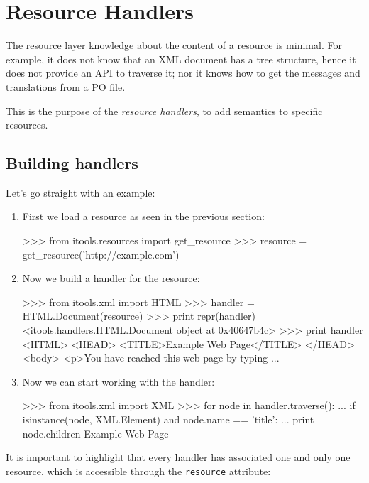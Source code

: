 \chapter{Resource Handlers}

The resource layer knowledge about the content of a resource is minimal.
For example, it does not know that an XML document has a tree structure,
hence it does not provide an API to traverse it; nor it knows how to get
the messages and translations from a PO file.

This is the purpose of the {\em resource handlers}, to add semantics to
specific resources.


\section{Building handlers}

Let's go straight with an example:

\begin{enumerate}
  \item First we load a resource as seen in the previous section:
\begin{code}
    >>> from itools.resources import get_resource
    >>> resource = get_resource('http://example.com')
\end{code}

  \item Now we build a handler for the resource:
\begin{code}
    >>> from itools.xml import HTML
    >>> handler = HTML.Document(resource)
    >>> print repr(handler)
    <itools.handlers.HTML.Document object at 0x40647b4c>
    >>> print handler
    <HTML>
    <HEAD>
      <TITLE>Example Web Page</TITLE>
    </HEAD> 
    <body>  
    <p>You have reached this web page by typing
    ...
\end{code}

  \item Now we can start working with the handler:
\begin{code}
    >>> from itools.xml import XML
    >>> for node in handler.traverse():
    ...     if isinstance(node, XML.Element) and node.name == 'title':
    ...         print node.children
    Example Web Page
\end{code}
\end{enumerate}



It is important to highlight that every handler has associated one and only
one resource, which is accessible through the {\tt resource} attribute:

